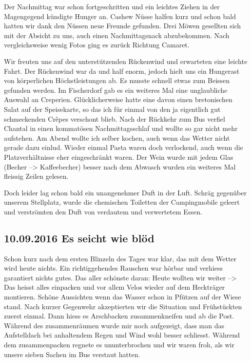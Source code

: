 Der Nachmittag war schon fortgeschritten und ein leichtes Ziehen in der Magengegend kündigte Hunger an.
Cashew Nüsse halfen kurz und schon bald hatten wir dank den Nüssen neue Freunde gefunden.
Drei Möwen gesellten sich mit der Absicht zu uns, auch einen Nachmittagsnack abzubekommen.
Nach vergleichsweise wenig Fotos ging es zurück Richtung Camaret.

Wir freuten uns auf den unterstützenden Rückenwind und erwarteten eine leichte Fahrt.
Der Rückenwind war da und half enorm, jedoch hielt uns ein Hungerast von körperlichen Höchstleistungen ab.
Es musste schnell etwas zum Beissen gefunden werden.
Im Fischerdorf gab es ein weiteres Mal eine unglaubliche Auswahl an Creperien.
Glücklicherweise hatte eine davon einen bretonischen Salat auf der Speisekarte, so das ich für einmal von den ja eigentlich gut schmeckenden Cr\^{e}pes verschont blieb.
Nach der Rückkehr zum Bus verfiel Chantal in einen kommatösen Nachmittagsschlaf und wollte so gar nicht mehr aufstehen.
Am Abend wollte ich selber kochen, auch wenn das Wetter nicht gerade dazu einlud.
Wieder einmal Pasta waren doch verlockend, auch wenn die Platzverhältnisse eher eingeschränkt waren.
Der Wein wurde mit jedem Glas (Becher --> Kaffeebecher) besser nach dem Abwasch wurden ein weiteres Mal fleissig Zeilen gelesen.

Doch leider lag schon bald ein unangenehmer Duft in der Luft.
Schräg gegenüber unserem Stellplatz, wurde die chemischen Toiletten der Campingmobile geleert und verströmten den Duft von verdautem und verwertetem Essen.

\subsection{10.09.2016 Es seicht wie blöd}
Schon kurz nach dem ersten Blinzeln des Tages war klar, das mit dem Wetter wird heute nichts.
Ein richtiggehendes Rauschen war hörbar und verhiess garantiert nichts gutes.
Das aller schönste daran: Heute wollten wir weiter --> Das heisst alles einpacken und vor allem Velos wieder auf dem Heckträger montieren.
Schöne Aussichten wenn das Wasser schon in Pfützen auf der Wiese stand.
Nach kurzer Gegenwehr akzeptierten wir die Situation und Frühstückten zuerst einmal.
Dann hiess es Arschbacken zusammenkneifen und ab die Post.
Während des zusammenräumen wurde mir noch aufgezeigt, dass man das Aufstelldach bei anhaltendem Regen und Wind wohl besser schliesst.
Während dem zusammenpacken regnete es ununterbrochen und wir waren froh, als wir unsere sieben Sachen im Bus verstaut hatten.

